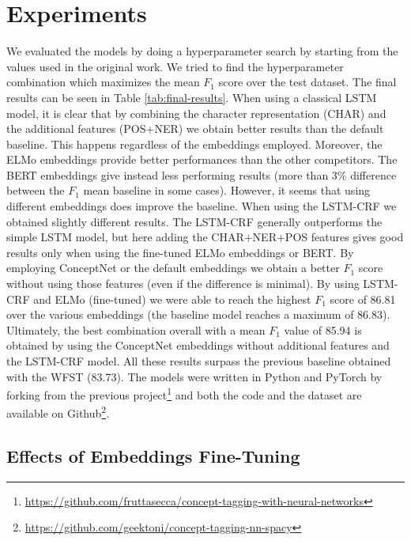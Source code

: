 \documentclass[11pt,a4paper]{article}
\begin{document}
\section{Experiments}

We evaluated the models by doing a hyperparameter search by starting from the values used in the original work. We tried to find the hyperparameter combination which maximizes the mean $F_1$ score over the test dataset. The final results can be seen in Table \ref{tab:final-results}.
When using a classical LSTM model, it is clear that by combining the character representation (CHAR) and the additional features (POS+NER) we obtain better results than the default baseline. This happens regardless of the embeddings employed. Moreover, the ELMo embeddings provide better performances than the other competitors. 
The BERT embeddings give instead less performing results (more than 3\% difference between the $F_1$ mean baseline in some cases). However, it seems that using different embeddings does improve the baseline.
When using the LSTM-CRF we obtained slightly different results. The LSTM-CRF generally outperforms the simple LSTM model, but here adding the CHAR+NER+POS features gives good results only when using the fine-tuned ELMo embeddings or BERT. By employing ConceptNet or the default embeddings we obtain a better $F_1$ score without using those features (even if the difference is minimal).
By using LSTM-CRF and ELMo (fine-tuned) we were able to reach the highest $F_1$ score of 86.81 over the various embeddings (the baseline model reaches a maximum of 86.83). Ultimately, the best combination overall with a mean $F_1$ value of 85.94 is obtained by using the ConceptNet embeddings without additional features and the LSTM-CRF model. All these results surpass the previous baseline obtained with the WFST (83.73).
The models were written in Python and PyTorch by forking from the previous project\footnote{\url{https://github.com/fruttasecca/concept-tagging-with-neural-networks}} and both the code and the dataset are available on Github\footnote{\url{https://github.com/geektoni/concept-tagging-nn-spacy}}.

\subsection{Effects of Embeddings Fine-Tuning}
\end{document}

